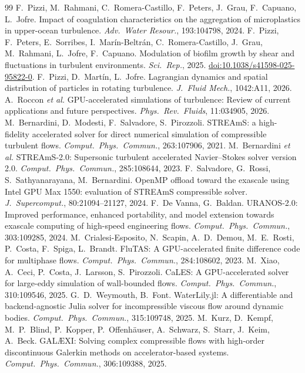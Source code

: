 \documentclass[11pt]{article}
\begin{document}
\begin{thebibliography}{99}
 F.\ Pizzi, M.\ Rahmani, C.\ Romera-Castillo, F.\ Peters, J.\ Grau, F.\ Capuano, L.\ Jofre. Impact of coagulation characteristics on the aggregation of microplastics in upper-ocean turbulence. \emph{Adv.\ Water Resour.}, 193:104798, 2024.
 F.\ Pizzi, F.\ Peters, E.\ Sorribes, I.\ Mar\'in-Beltr\'an, C.\ Romera-Castillo, J.\ Grau, M.\ Rahmani, L.\ Jofre, F.\ Capuano. Modulation of biofilm growth by shear and fluctuations in turbulent environments. \emph{Sci.\ Rep.}, 2025. \href{https://doi.org/10.1038/s41598-025-95822-0}{doi:10.1038/s41598-025-95822-0}.
 F.\ Pizzi, D.\ Mart\'in, L.\ Jofre. Lagrangian dynamics and spatial distribution of particles in rotating turbulence. \emph{J.\ Fluid Mech.}, 1042:A11, 2026.
 A.\ Roccon \emph{et al.} GPU-accelerated simulations of turbulence: Review of current applications and future perspectives. \emph{Phys.\ Rev.\ Fluids}, 11:034905, 2026.
 M.\ Bernardini, D.\ Modesti, F.\ Salvadore, S.\ Pirozzoli. STREAmS: a high-fidelity accelerated solver for direct numerical simulation of compressible turbulent flows. \emph{Comput.\ Phys.\ Commun.}, 263:107906, 2021.
 M.\ Bernardini \emph{et al.} STREAmS-2.0: Supersonic turbulent accelerated Navier--Stokes solver version 2.0. \emph{Comput.\ Phys.\ Commun.}, 285:108644, 2023.
 F.\ Salvadore, G.\ Rossi, S.\ Sathyanarayana, M.\ Bernardini. OpenMP offload toward the exascale using Intel GPU Max 1550: evaluation of STREAmS compressible solver. \emph{J.\ Supercomput.}, 80:21094--21127, 2024.
 F.\ De Vanna, G.\ Baldan. URANOS-2.0: Improved performance, enhanced portability, and model extension towards exascale computing of high-speed engineering flows. \emph{Comput.\ Phys.\ Commun.}, 303:109285, 2024.
 M.\ Crialesi-Esposito, N.\ Scapin, A.\ D.\ Demou, M.\ E.\ Rosti, P.\ Costa, F.\ Spiga, L.\ Brandt. FluTAS: A GPU-accelerated finite difference code for multiphase flows. \emph{Comput.\ Phys.\ Commun.}, 284:108602, 2023.
 M.\ Xiao, A.\ Ceci, P.\ Costa, J.\ Larsson, S.\ Pirozzoli. CaLES: A GPU-accelerated solver for large-eddy simulation of wall-bounded flows. \emph{Comput.\ Phys.\ Commun.}, 310:109546, 2025.
 G.\ D.\ Weymouth, B.\ Font. WaterLily.jl: A differentiable and backend-agnostic Julia solver for incompressible viscous flow around dynamic bodies. \emph{Comput.\ Phys.\ Commun.}, 315:109748, 2025.
 M.\ Kurz, D.\ Kempf, M.\ P.\ Blind, P.\ Kopper, P.\ Offenh\"auser, A.\ Schwarz, S.\ Starr, J.\ Keim, A.\ Beck. GAL\AE XI: Solving complex compressible flows with high-order discontinuous Galerkin methods on accelerator-based systems. \emph{Comput.\ Phys.\ Commun.}, 306:109388, 2025.

\end{thebibliography}
\end{document}
